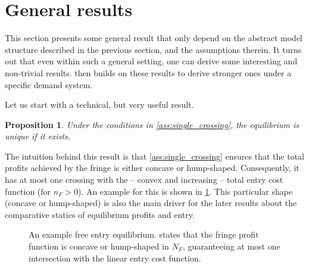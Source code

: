 \documentclass[a4paper]{article}
\newtheorem{proposition}{Proposition}
\begin{document}
\section{General results}
\label{sec:results}

This section presents some general result that only depend on the abstract model structure described in the previous section, and the assumptions therein.
It turns out that even within such a general setting, one can derive some interesting and non-trivial results.
 then builds on these results to derive stronger ones under a specific demand system.

Let us start with a technical, but very useful result.
\begin{proposition}
    \label{prop:unique_equilibrium}
    Under the conditions in \cref{ass:single_crossing}, the equilibrium is unique if it exists.
\end{proposition}
The intuition behind this result is that \cref{ass:single_crossing} ensures that the total profits achieved by the fringe is either concave or hump-shaped.
Consequently, it has at most one crossing with the -- convex and increasing -- total entry cost function (for $n_F > 0$).
An example for this is shown in \cref{fig:equilibrium}.
This particular shape (concave or hump-shaped) is also the main driver for the later results about the comparative statics of equilibrium profits and entry.

\begin{figure}[ht]
    \centering
    \caption{An example free entry equilibrium.  states that the fringe profit function is concave or hump-shaped in $N_F$, guaranteeing at most one intersection with the linear entry cost function.}
    \label{fig:equilibrium}
\end{figure}
\end{document}
